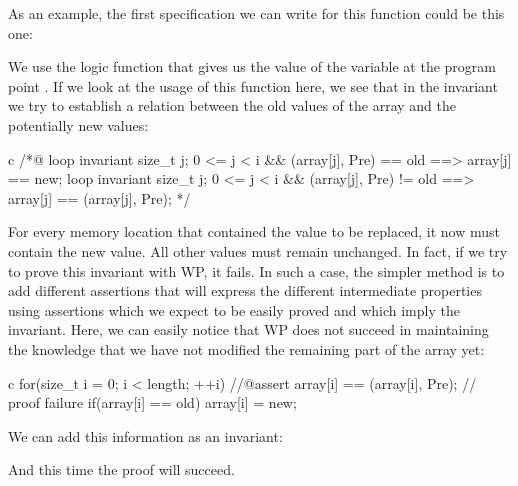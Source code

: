 As an example, the first specification we can write for this function
could be this one:






We use the logic function  that gives us the
value of the variable  at the program point .
If we look at the usage of this function here, we see that in the
invariant we try to establish a relation between the old values of the
array and the potentially new values:



\begin{CodeBlock}{c}
/*@
  loop invariant \forall size_t j; 0 <= j < i && \at(array[j], Pre) == old 
                   ==> array[j] == new;
  loop invariant \forall size_t j; 0 <= j < i && \at(array[j], Pre) != old 
                   ==> array[j] == \at(array[j], Pre);
*/
\end{CodeBlock}



For every memory location that contained the value to be replaced, it now must
contain the new value. All other values must remain unchanged. In fact, if we
try to prove this invariant with WP, it fails. In such a case, the simpler
method is to add different assertions that will express the different
intermediate properties using assertions which we expect to be easily proved
and which imply the invariant. Here, we can easily notice that WP does not
succeed in maintaining the knowledge that we have not modified the remaining
part of the array yet:




\begin{CodeBlock}{c}
for(size_t i = 0; i < length; ++i){
    //@assert array[i] == \at(array[i], Pre); // proof failure
    if(array[i] == old) array[i] = new;
}
\end{CodeBlock}



We can add this information as an invariant:






And this time the proof will succeed.




